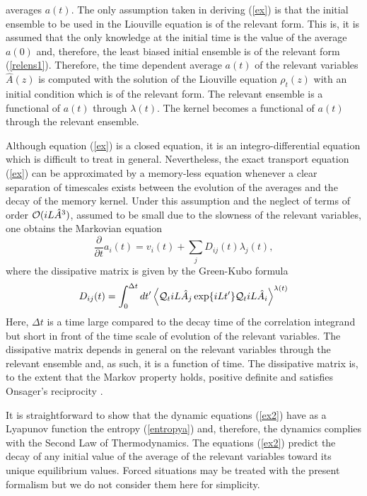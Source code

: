 \documentclass[b5paper,openright,10pt]{book}
\begin{document}
averages $a(t)$.  The only assumption  taken in deriving (\ref{ex}) is
that the initial  ensemble to be used in the  Liouville equation is of
the relevant form.  This is, it is assumed that  the only knowledge at
the initial  time is the value  of the average $a(0)$  and, therefore,
the  least   biased  initial   ensemble  is   of  the   relevant  form
(\ref{relens1}).  Therefore, the time  dependent average $a(t)$ of the
relevant variables $\hat{A}(z)$  is computed with the  solution of the
Liouville equation $\rho_t(z)$  with an initial condition  which is of
the relevant  form.  The relevant  ensemble is a functional  of $a(t)$
through  $\lambda(t)$.   The kernel  becomes  a  functional of  $a(t)$
through the relevant  ensemble.  

Although equation  (\ref{ex})  is a closed
equation, it is an integro-differential  equation which is difficult to
treat  in   general.   Nevertheless,  the  exact   transport  equation
(\ref{ex}) can  be approximated by  a memory-less equation  whenever a
clear separation  of timescales  exists between the evolution  of the
averages and  the decay of  the memory kernel. Under  this assumption
and the  neglect of terms of  order ${\cal O}( iL\hat{A}^3)$,  assumed to be
small due to  the slowness of the relevant variables,  one obtains the
Markovian equation \cite{Grabert1982}
\begin{equation}
  \frac{\partial}{\partial t}a_i(t) = v_i(t) + \sum_j D_{ij}(t) \lambda_j(t),
\label{ex2}
\end{equation}
where  the  dissipative matrix  is  given  by  the Green-Kubo  formula
\begin{equation}
D_{ij}(t)=\int_0^{\Delta t} dt'\left\langle 
{\cal Q}_t iL\hat{A}_j\exp\{iLt'\}{\cal Q}_t iL\hat{A}_i
\right\rangle^{\lambda(t)}
\label{dij}
\end{equation}
Here,  $\Delta t$ is  a  time large  compared  to the  decay  time of  the
correlation  integrand  but  short  in  front of  the  time  scale  of
evolution of  the relevant variables.  The  dissipative matrix depends
in general  on the  relevant variables  through the  relevant ensemble
and, as such, it is a function of time.  The dissipative matrix is, to
the  extent that  the  Markov property  holds,  positive definite  and
satisfies Onsager's reciprocity \cite{Grabert1982}. 

It is straightforward  to show that the  dynamic equations (\ref{ex2})
have  as  a  Lyapunov   function  the  entropy  (\ref{entropya})  and,
therefore,   the   dynamics   complies   with  the   Second   Law   of
Thermodynamics.  The  equations (\ref{ex2})  predict the decay  of any
initial value  of the  average of the  relevant variables  toward its
unique equilibrium  values. Forced situations may  be treated
with the present  formalism \cite{Grabert1982} but we  do not consider
them here for simplicity.
\end{document}
